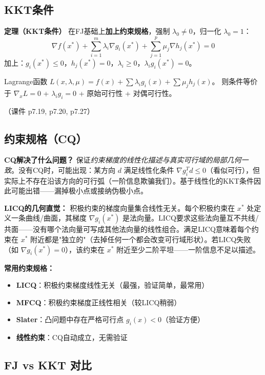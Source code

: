\subsection{KKT条件}

\textbf{定理（KKT条件）}
在FJ基础上\textbf{加上约束规格}，强制 $\lambda_0 \neq 0$，归一化 $\lambda_0=1$：
\[
\nabla f(x^*) + \sum_{i=1}^m \lambda_i \nabla g_i(x^*) + \sum_{j=1}^p \mu_j \nabla h_j(x^*) = 0
\]
加上：$g_i(x^*)\le 0$，$h_j(x^*)=0$，$\lambda_i\ge 0$，$\lambda_i g_i(x^*)=0$。

Lagrange函数 $L(x,\lambda,\mu)=f(x)+\sum\lambda_i g_i(x)+\sum\mu_j h_j(x)$。
则条件等价于 $\nabla_x L=0$ + $\lambda_i g_i=0$ + 原始可行性 + 对偶可行性。

（课件 p7.19, p7.20, p7.27）

\subsection{约束规格（CQ）}

\textbf{CQ解决了什么问题？} 保证\emph{约束梯度的线性化描述与真实可行域的局部几何一致}。没有CQ时，可能出现：某方向 $d$ 满足线性化条件 $\nabla g_i^T d\le0$（看似可行），但实际上不存在沿该方向的可行弧（一阶信息欺骗我们）。基于线性化的KKT条件因此可能出错——漏掉极小点或接纳伪极小点。

\textbf{LICQ的几何直觉：} 积极约束的梯度向量集合线性无关。每个积极约束在 $x^*$ 处定义一条曲线/曲面，其梯度 $\nabla g_i(x^*)$ 是法向量。LICQ要求这些法向量互不共线/共面——没有哪个法向量可写成其他法向量的线性组合。满足LICQ意味着每个约束在 $x^*$ 附近都是"独立的"（去掉任何一个都会改变可行域形状）。若LICQ失败（如 $\nabla g_i(x^*)=0$），该约束在 $x^*$ 附近至少二阶平坦——一阶信息不足以描述。

\textbf{常用约束规格：}
\begin{itemize}
  \item \textbf{LICQ}：积极约束梯度线性无关（最强，验证简单，最常用）
  \item \textbf{MFCQ}：积极约束梯度正线性相关（较LICQ稍弱）
  \item \textbf{Slater}：凸问题中存在严格可行点 $g_i(x)<0$（验证方便）
  \item \textbf{线性约束}：CQ自动成立，无需验证
\end{itemize}

\subsection{FJ vs KKT 对比}

